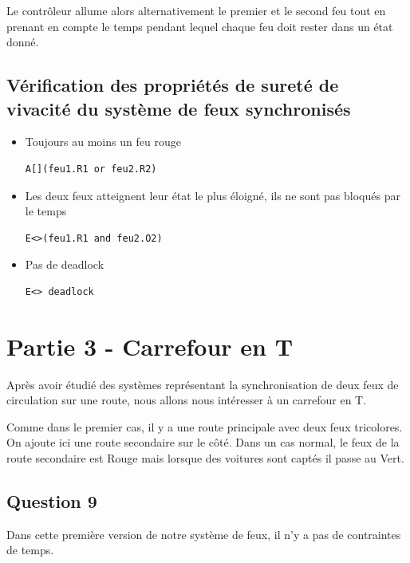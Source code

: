 \documentclass[11pt]{article}
\begin{document}
Le contrôleur allume alors alternativement le premier et le second feu tout en prenant en compte le temps pendant lequel chaque feu doit rester dans un état donné.

\subsection*{Vérification des propriétés de sureté de vivacité du système de feux synchronisés}

\begin{itemize}
	\item Toujours au moins un feu rouge
\begin{verbatim}
A[](feu1.R1 or feu2.R2)
\end{verbatim}

	\item Les deux feux atteignent leur état le plus éloigné, ils ne sont pas bloqués par le temps
\begin{verbatim}
E<>(feu1.R1 and feu2.O2)
\end{verbatim}

	\item Pas de deadlock
\begin{verbatim}
E<> deadlock
\end{verbatim}

\end{itemize}

\section{Partie 3 - Carrefour en T}
Après avoir étudié des systèmes représentant la synchronisation de deux feux de circulation sur une route, nous allons nous intéresser à un carrefour en T.

Comme dans le premier cas, il y a une route principale avec deux feux tricolores. On ajoute ici une route secondaire sur le côté. Dans un cas normal, le feux de la route secondaire est Rouge mais lorsque des voitures sont captés il passe au Vert.

\subsection{Question 9}

Dans cette première version de notre système de feux, il n'y a pas de contraintes de temps.
\end{document}
